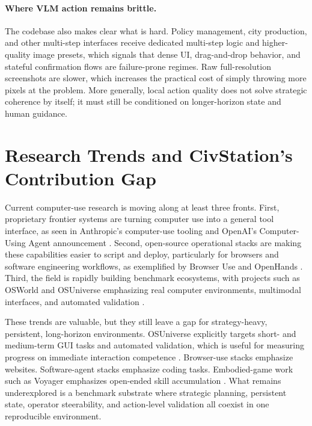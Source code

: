 \paragraph{Where VLM action remains brittle.}
The codebase also makes clear what is hard. Policy management, city production, and other multi-step interfaces receive dedicated multi-step logic and higher-quality image presets, which signals that dense UI, drag-and-drop behavior, and stateful confirmation flows are failure-prone regimes. Raw full-resolution screenshots are slower, which increases the practical cost of simply throwing more pixels at the problem. More generally, local action quality does not solve strategic coherence by itself; it must still be conditioned on longer-horizon state and human guidance.

\section{Research Trends and CivStation's Contribution Gap}

Current computer-use research is moving along at least three fronts. First, proprietary frontier systems are turning computer use into a general tool interface, as seen in Anthropic's computer-use tooling and OpenAI's Computer-Using Agent announcement \cite{anthropic_computer_use, openai_cua}. Second, open-source operational stacks are making these capabilities easier to script and deploy, particularly for browsers and software engineering workflows, as exemplified by Browser Use and OpenHands \cite{browser_use, openhands_docs, openhands_repo}. Third, the field is rapidly building benchmark ecosystems, with projects such as OSWorld and OSUniverse emphasizing real computer environments, multimodal interfaces, and automated validation \cite{osworld_project, osuniverse}.

These trends are valuable, but they still leave a gap for strategy-heavy, persistent, long-horizon environments. OSUniverse explicitly targets short- and medium-term GUI tasks and automated validation, which is useful for measuring progress on immediate interaction competence \cite{osuniverse}. Browser-use stacks emphasize websites. Software-agent stacks emphasize coding tasks. Embodied-game work such as Voyager emphasizes open-ended skill accumulation \cite{voyager}. What remains underexplored is a benchmark substrate where strategic planning, persistent state, operator steerability, and action-level validation all coexist in one reproducible environment.

